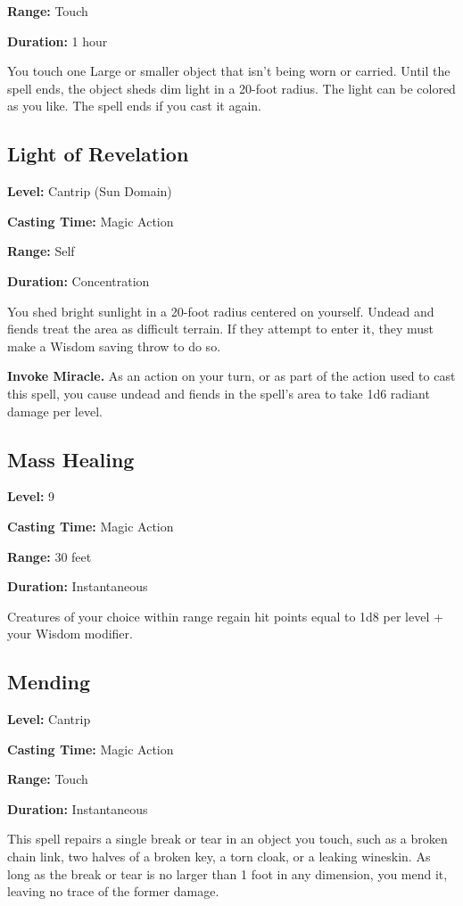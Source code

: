 \documentclass[12pt,letterpaper,twocolumn,openany,nodeprecatedcode,bg=none]{dndbook}
\begin{document}
\textbf{Range:} Touch

\textbf{Duration:} 1 hour

You touch one Large or smaller object that isn't being worn or carried.
Until the spell ends, the object sheds dim light in a 20-foot radius.
The light can be colored as you like. The spell ends if you cast it
again.

\subsection{Light of Revelation}\label{light-of-revelation}

\textbf{Level:} Cantrip (Sun Domain)

\textbf{Casting Time:} Magic Action

\textbf{Range:} Self

\textbf{Duration:} Concentration

You shed bright sunlight in a 20-foot radius centered on yourself.
Undead and fiends treat the area as difficult terrain. If they attempt
to enter it, they must make a Wisdom saving throw to do so.

\textbf{Invoke Miracle.} As an action on your turn, or as part of the
action used to cast this spell, you cause undead and fiends in the
spell's area to take 1d6 radiant damage per level.

\subsection{Mass Healing}\label{mass-healing}

\textbf{Level:} 9

\textbf{Casting Time:} Magic Action

\textbf{Range:} 30 feet

\textbf{Duration:} Instantaneous

Creatures of your choice within range regain hit points equal to 1d8 per
level + your Wisdom modifier.

\subsection{Mending}\label{mending}

\textbf{Level:} Cantrip

\textbf{Casting Time:} Magic Action

\textbf{Range:} Touch

\textbf{Duration:} Instantaneous

This spell repairs a single break or tear in an object you touch, such
as a broken chain link, two halves of a broken key, a torn cloak, or a
leaking wineskin. As long as the break or tear is no larger than 1 foot
in any dimension, you mend it, leaving no trace of the former damage.
\end{document}
